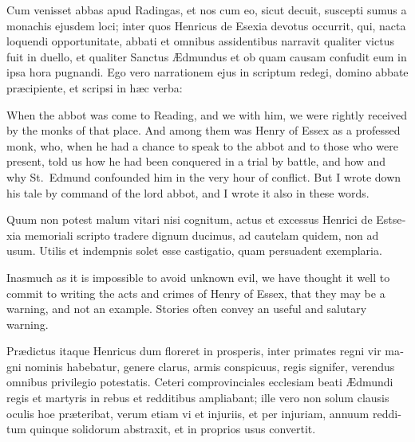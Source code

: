 \documentclass{book}
\begin{document}
\begin{paracol}{2}
\switchcolumn*

\begin{otherlanguage}{latin}
Cum venisset abbas apud Radingas, et nos cum eo, sicut decuit, suscepti sumus a monachis ejusdem loci; inter quos Henricus de Esexia devotus occurrit, qui, nacta loquendi opportunitate, abbati et omnibus assidentibus narravit qualiter victus fuit in duello, et qualiter Sanctus \AE{}dmundus et ob quam causam confudit eum in ipsa hora pugnandi. Ego vero narrationem ejus in scriptum redegi, domino abbate pr\ae{}cipiente, et scripsi in h\ae{}c verba:
\end{otherlanguage}

\switchcolumn

When the abbot was come to Reading, and we with him, we were rightly received by the monks of that place. And among them was Henry of Essex as a professed monk, who, when he had a chance to speak to the abbot and to those who were present, told us how he had been conquered in a trial by battle, and how and why St.\ Edmund confounded him in the very hour of conflict. But I wrote down his tale by command of the lord abbot, and I wrote it also in these words.

\switchcolumn*

\begin{otherlanguage}{latin}
Quum non potest malum vitari nisi cognitum, actus et excessus Henrici de Estsexia memoriali scripto tradere dignum ducimus, ad cautelam quidem, non ad usum. Utilis et indempnis solet esse castigatio, quam persuadent exemplaria.
\end{otherlanguage}

\switchcolumn

Inasmuch as it is impossible to avoid unknown evil, we have thought it well to commit to writing the acts and crimes of Henry of Essex, that they may be a warning, and not an example. Stories often convey an useful and salutary warning.

\switchcolumn*

\begin{otherlanguage}{latin}
Pr\ae{}dictus itaque Henricus dum floreret in prosperis, inter primates regni vir magni nominis habebatur, genere clarus, armis conspicuus, regis signifer, verendus omnibus privilegio potestatis. Ceteri comprovinciales ecclesiam beati \AE{}dmundi regis et martyris in rebus et redditibus ampliabant; ille vero non solum clausis oculis hoe pr\ae{}teribat, verum etiam vi et injuriis, et per injuriam, annuum redditum quinque solidorum abstraxit, et in proprios usus convertit.
\end{otherlanguage}


\end{paracol}
\end{document}
